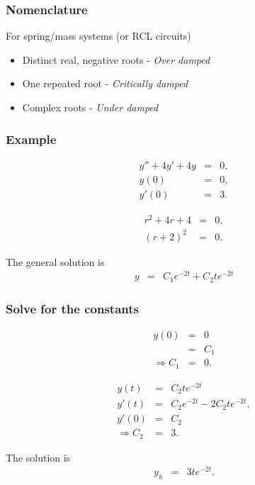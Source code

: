 \begin{frame}
  \frametitle{Nomenclature}

  For spring/mass systems (or RCL circuits)
  \begin{itemize}
  \item Distinct real, negative roots - \textit{Over damped}
  \item One repeated root - \textit{Critically damped}
  \item Complex roots - \textit{Under damped}
  \end{itemize}

\end{frame}

\begin{frame}
  \frametitle{Example}

  \begin{eqnarray*}
    y'' + 4y' + 4y & = & 0, \\
    y(0) & = & 0, \\
    y'(0) & = & 3.
  \end{eqnarray*}

  {
    \begin{eqnarray*}
      r^2 + 4r + 4 & = & 0, \\
      (r+2)^2 & = & 0.
    \end{eqnarray*}

    The general solution is
    \begin{eqnarray*}
      y & = & C_1 e^{-2t} + C_2 t e^{-2t}
    \end{eqnarray*}

  }

\end{frame}



\begin{frame}
  \frametitle{Solve for the constants}

  \begin{eqnarray*}
    y(0) & = & 0 \\
    & = & C_1 \\
    \Rightarrow C_1 & = & 0.
  \end{eqnarray*}

  \begin{eqnarray*}
    y(t) & = & C_2 t e^{-2t} \\
    y'(t) & = & C_2 e^{-2t} - 2 C_2 t e^{-2t}, \\
    y'(0) & = & C_2 \\
    \Rightarrow C_2 & = & 3.
  \end{eqnarray*}

  The solution is
  \begin{eqnarray*}
    y_h & = & 3 t e^{-2t}.
  \end{eqnarray*}

\end{frame}

